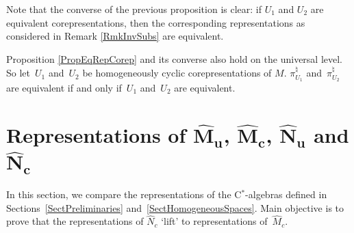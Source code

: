 Note that the converse of the previous proposition is clear: if $U_1$ and $U_2$ are equivalent corepresentations, then the corresponding representations as considered in Remark \ref{RmkInvSubs} are equivalent.

\begin{rmk}\label{RmkAlsoUniv}
Proposition \ref{PropEqRepCorep} and its converse also hold on the universal level. So let~$U_1$ and~$U_2$ be homogeneously cyclic corepresentations of $M$. $\pi_{U_1}^\natural$ and~$\pi_{U_2}^\natural$
 are equivalent if and only if~$U_1$ and~$U_2$ are equivalent.
\end{rmk}



\section[Representations of $\hat{M}_u$, $\hat{M}_c$, $\hat{N}_u$ and $\hat{N}_c$]{Representations of $\boldsymbol{\hat{M}_u}$, $\boldsymbol{\hat{M}_c}$, $\boldsymbol{\hat{N}_u}$ and $\boldsymbol{\hat{N}_c}$}\label{SectCorrespondence}

In this section, we compare the representations of the C$^\ast$-algebras def\/ined in Sections~\ref{SectPreliminaries} and~\ref{SectHomogeneousSpaces}. Main objective is to prove that the representations of $\hat{N}_c$ `lift' to representations of~$\hat{M}_c$.


